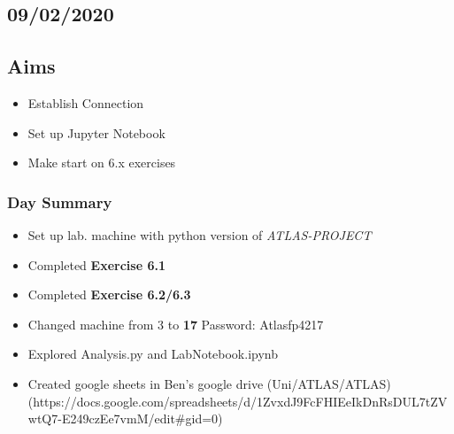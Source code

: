 \subsection*{\textbf{09/02/2020}}
\subsection{Aims}
\begin{itemize}
    \item Establish Connection
    \item Set up Jupyter Notebook
    \item Make start on 6.x exercises
\end{itemize}

\subsubsection{Day Summary}
\begin{itemize}
    \item Set up lab. machine with python version of \textit{ATLAS-PROJECT}
    \item Completed \textbf{Exercise 6.1}
    \item Completed \textbf{Exercise 6.2/6.3}
    \item Changed machine from 3 to \textbf{17}
    \subitem Password: Atlasfp4217
    \item Explored Analysis.py and LabNotebook.ipynb
    
    \item Created google sheets in Ben's google drive (Uni/ATLAS/ATLAS) (https://docs.google.com/spreadsheets/d/1ZvxdJ9FcFHIEeIkDnRsDUL7tZVwtQ7-E249czEe7vmM/edit#gid=0)
\end{itemize}

